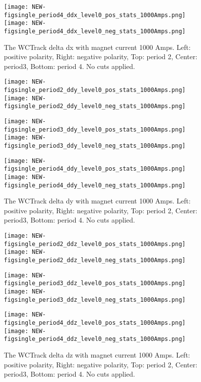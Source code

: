 \begin{description}
{\begin{figure}[h]
 	\texttt{[image: NEW-figsingle\_period4\_ddx\_level0\_pos\_stats\_1000Amps.png]}
	 \texttt{[image: NEW-figsingle\_period4\_ddx\_level0\_neg\_stats\_1000Amps.png]}
   \caption[short]{The WCTrack delta dx with magnet current 1000 Amps. Left: positive polarity, Right: negative polarity, Top: period 2, Center: period3,  Bottom: period 4. No cuts applied.}
   \label{fig_ddx}
  \end{figure}
  
  
   \begin{figure}[h]	 
     \centering   
   
      	\texttt{[image: NEW-figsingle\_period2\_ddy\_level0\_pos\_stats\_1000Amps.png]}
	 \texttt{[image: NEW-figsingle\_period2\_ddy\_level0\_neg\_stats\_1000Amps.png]}
	 
   	\texttt{[image: NEW-figsingle\_period3\_ddy\_level0\_pos\_stats\_1000Amps.png]}
	 \texttt{[image: NEW-figsingle\_period3\_ddy\_level0\_neg\_stats\_1000Amps.png]}
	 
 	\texttt{[image: NEW-figsingle\_period4\_ddy\_level0\_pos\_stats\_1000Amps.png]}
	 \texttt{[image: NEW-figsingle\_period4\_ddy\_level0\_neg\_stats\_1000Amps.png]}
   \caption[short]{The WCTrack delta dy with magnet current 1000 Amps. Left: positive polarity, Right: negative polarity, Top: period 2, Center: period3,   Bottom: period 4. No cuts applied.}
   \label{fig_ddy}
  \end{figure}
  
     \begin{figure}[h]	 
       \centering   
     
        	\texttt{[image: NEW-figsingle\_period2\_ddz\_level0\_pos\_stats\_1000Amps.png]}
	 \texttt{[image: NEW-figsingle\_period2\_ddz\_level0\_neg\_stats\_1000Amps.png]}
	 
   	\texttt{[image: NEW-figsingle\_period3\_ddz\_level0\_pos\_stats\_1000Amps.png]}
	 \texttt{[image: NEW-figsingle\_period3\_ddz\_level0\_neg\_stats\_1000Amps.png]}
	 
 	\texttt{[image: NEW-figsingle\_period4\_ddz\_level0\_pos\_stats\_1000Amps.png]}
	 \texttt{[image: NEW-figsingle\_period4\_ddz\_level0\_neg\_stats\_1000Amps.png]}
   \caption[short]{The WCTrack delta dz with magnet current 1000 Amps. Left: positive polarity, Right: negative polarity, Top: period 2, Center: period3,  Bottom: period 4. No cuts applied.}
   \label{fig_ddz}
  \end{figure}

}
\end{description}
